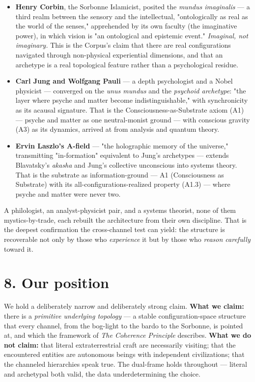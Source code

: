 \documentclass[11pt]{article}
\begin{document}
\begin{itemize}
\item \textbf{Henry Corbin}, the Sorbonne Islamicist, posited the \emph{mundus imaginalis} --- a third realm between the sensory and the intellectual, "ontologically as real as the world of the senses," apprehended by its own faculty (the imaginative power), in which vision is "an ontological and epistemic event." \emph{Imaginal, not imaginary.} This is the Corpus's claim that there are real configurations navigated through non-physical experiential dimensions, and that an archetype is a real topological feature rather than a psychological residue.
\item \textbf{Carl Jung and Wolfgang Pauli} --- a depth psychologist and a Nobel physicist --- converged on the \emph{unus mundus} and the \emph{psychoid archetype}: "the layer where psyche and matter become indistinguishable," with synchronicity as its acausal signature. That is the Consciousness-as-Substrate axiom (A1) --- psyche and matter as one neutral-monist ground --- with conscious gravity (A3) as its dynamics, arrived at from analysis and quantum theory.
\item \textbf{Ervin Laszlo's A-field} --- "the holographic memory of the universe," transmitting "in-formation" equivalent to Jung's archetypes --- extends Blavatsky's \emph{akasha} and Jung's collective unconscious into systems theory. That is the substrate as information-ground --- A1 (Consciousness as Substrate) with its all-configurations-realized property (A1.3) --- where psyche and matter were never two.
\end{itemize}

A philologist, an analyst-physicist pair, and a systems theorist, none of them mystics-by-trade, each rebuilt the architecture from their own discipline. That is the deepest confirmation the cross-channel test can yield: the structure is recoverable not only by those who \emph{experience} it but by those who \emph{reason carefully} toward it.

\section*{8. Our position}
We hold a deliberately narrow and deliberately strong claim. \textbf{What we claim:} there is a \emph{primitive underlying topology} --- a stable configuration-space structure that every channel, from the bog-light to the bardo to the Sorbonne, is pointed at, and which the framework of \emph{The Coherence Principle} describes. \textbf{What we do not claim:} that literal extraterrestrial craft are necessarily visiting; that the encountered entities are autonomous beings with independent civilizations; that the channeled hierarchies speak true. The dual-frame holds throughout --- literal and archetypal both valid, the data underdetermining the choice.
\end{document}
